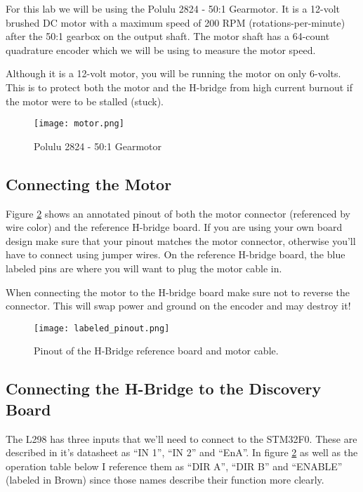 \documentclass[11pt,fleqn]{book} %
\begin{document}
For this lab we will be using the Polulu 2824 - 50:1 Gearmotor. It is a 12-volt brushed DC motor with a maximum speed of 200 RPM (rotations-per-minute) after the 50:1 gearbox on the output shaft. The motor shaft has a 64-count quadrature encoder which we will be using to measure the motor speed. 

Although it is a 12-volt motor, you will be running the motor on only 6-volts. This is to protect both the motor and the H-bridge from high current burnout if the motor were to be stalled (stuck).


\begin{figure}[tb]
    \centering\texttt{[image: motor.png]}
    \caption{Polulu 2824 - 50:1 Gearmotor}
    \label{motor}
\end{figure}

\subsection{Connecting the Motor}
Figure \ref{labeled_pinout} shows an annotated pinout of both the motor connector (referenced by wire color) and the reference H-bridge board. If you are using your own board design make sure that your pinout matches the motor connector, otherwise you'll have to connect using jumper wires. On the reference H-bridge board, the blue labeled pins are where you will want to plug the motor cable in.

\begin{warning}
    When connecting the motor to the H-bridge board make sure not to reverse the connector. This will swap power and ground on the encoder and may destroy it!
\end{warning}

\begin{figure}[t]
    \begin{center}
        \hspace*{-3.4cm}
        \texttt{[image: labeled\_pinout.png]}
        \caption{Pinout of the H-Bridge reference board and motor cable.}
        \label{labeled_pinout}
    \end{center}
\end{figure}


\subsection{Connecting the H-Bridge to the Discovery Board}
The L298 has three inputs that we'll need to connect to the STM32F0. These are described in it's datasheet as ``IN 1'', ``IN 2'' and ``EnA''. In figure \ref{labeled_pinout}  as well as the operation table below I reference them as ``DIR A'', ``DIR B'' and ``ENABLE'' (labeled in Brown) since those names describe their function more clearly.
\end{document}
